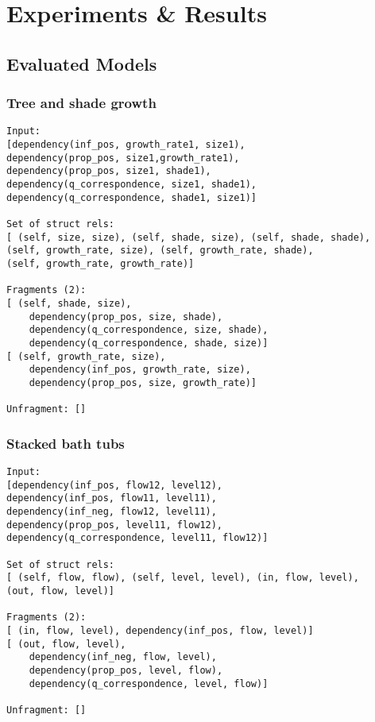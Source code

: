 \documentclass{article}
\begin{document}
\section{Experiments \& Results}
\subsection{Evaluated Models}


\subsubsection{Tree and shade growth} 

\begin{verbatim}
Input: 
[dependency(inf_pos, growth_rate1, size1), 
dependency(prop_pos, size1,growth_rate1), 
dependency(prop_pos, size1, shade1),
dependency(q_correspondence, size1, shade1), 
dependency(q_correspondence, shade1, size1)]

Set of struct rels: 
[ (self, size, size), (self, shade, size), (self, shade, shade), 
(self, growth_rate, size), (self, growth_rate, shade), 
(self, growth_rate, growth_rate)]

Fragments (2): 
[ (self, shade, size), 
	dependency(prop_pos, size, shade),
	dependency(q_correspondence, size, shade), 
	dependency(q_correspondence, shade, size)] 
[ (self, growth_rate, size),
	dependency(inf_pos, growth_rate, size),
	dependency(prop_pos, size, growth_rate)]

Unfragment: []
\end{verbatim}

\subsubsection{Stacked bath tubs}

\begin{verbatim}
Input: 
[dependency(inf_pos, flow12, level12), 
dependency(inf_pos, flow11, level11), 
dependency(inf_neg, flow12, level11), 
dependency(prop_pos, level11, flow12), 
dependency(q_correspondence, level11, flow12)]

Set of struct rels: 
[ (self, flow, flow), (self, level, level), (in, flow, level), 
(out, flow, level)]

Fragments (2): 
[ (in, flow, level), dependency(inf_pos, flow, level)]
[ (out, flow, level), 
	dependency(inf_neg, flow, level), 
	dependency(prop_pos, level, flow), 
	dependency(q_correspondence, level, flow)]

Unfragment: []
\end{verbatim}
\end{document}
